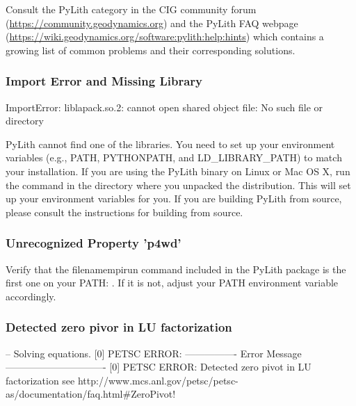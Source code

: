 Consult the PyLith category in the CIG community forum
(\url{https://community.geodynamics.org}) and the PyLith FAQ webpage
(\url{https://wiki.geodynamics.org/software:pylith:help:hints}) which
contains a growing list of common problems and their corresponding
solutions.

\subsubsection{Import Error and Missing Library}
\begin{shell}
ImportError: liblapack.so.2: cannot open shared object file: No such file or directory
\end{shell}

PyLith cannot find one of the libraries. You need to set up your environment
variables (e.g., PATH, PYTHONPATH, and LD\_LIBRARY\_PATH) to match
your installation. If you are using the PyLith binary on Linux or
Mac OS X, run the command in the directory
where you unpacked the distribution. This will set up your environment
variables for you. If you are building PyLith from source, please
consult the instructions for building from source.

\subsubsection{Unrecognized Property 'p4wd'}

\begin{shell}
-- pyre.inventory(error) } \\
-- p4wd <- 'true' } \\
-- unrecognized property 'p4wd' } \\
>> command line:: } \\
-- pyre.inventory(error) } \\
-- p4pg <- 'true' } \\
-- unrecognized property ' p4pg'}
\end{shell}
Verify that the filename{mpirun} command included in the PyLith package is
the first one on your PATH: . If it is not, adjust your PATH environment variable accordingly.

\subsubsection{Detected zero pivor in LU factorization}

\begin{shell}
-- Solving equations.
[0] PETSC ERROR: ----------------
Error Message -------------------------------
[0] PETSC ERROR: Detected zero pivot in LU factorization
see http://www.mcs.anl.gov/petsc/petsc-as/documentation/faq.html\#ZeroPivot!
\end{shell}

